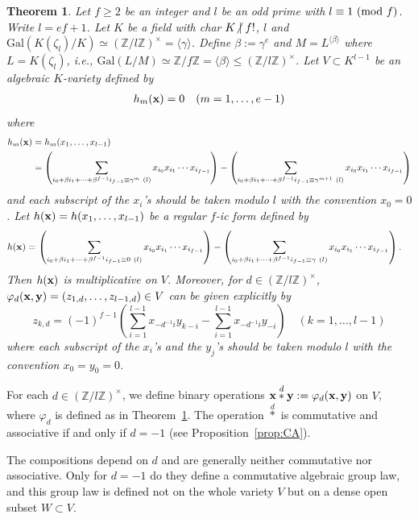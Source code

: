 \documentclass[a4paper, 11pt]{amsart}
\newcommand{\notmid}{\mathrel{\ooalign{$\mkern-5mu\not$\crcr$|$}}}
\newcommand{\Z}{\mathbb Z}
\newcommand{\Gal}{\mathrm{Gal}}
\theoremstyle{plain}
\newtheorem{thm}{Theorem}[section]
\theoremstyle{definition}
\numberwithin{equation}{section}
\begin{document}
\begin{thm}\label{mainth3}
Let $f\geq2$ be an integer and $l$ be an odd prime with $l \equiv 1\ ({\rm mod}\ f)$. 
Write $l=ef+1$.
Let $K$ be a field with char $K \notmid f!$, $l$ and 
$\Gal(K(\zeta_l)/K)\simeq (\Z/l\Z)^{\times}=\langle \gamma \rangle$. 
Define $\beta := \gamma^e$ and $M=L^{\langle \beta \rangle}$ where $L=K(\zeta_l)$, 
i.e., $\Gal(L/M)\simeq \Z/f\Z = \langle \beta \rangle \leq  (\Z/l\Z)^{\times}$.
Let $V \subset K^{l-1}$ be
an algebraic $K$-variety defined by
\begin{align*}
h_m({\bf x})=0\quad (m = 1,\ldots,e-1)
\end{align*}
where
\begin{align*}
h_m({\bf x})&=h_m(x_1,\ldots,x_{l-1})\\
&=\left(\sum_{i_0 + \beta i_1 + \cdots +\beta^{f-1}i_{f-1} \equiv \gamma^m \ (l)}x_{i_0}x_{i_1}\cdots x_{i_{f-1}}\right) - \left(\sum_{i_0 + \beta i_1 + \cdots +\beta^{f-1}i_{f-1} \equiv \gamma^{m+1} \ (l)}x_{i_0}x_{i_1}\cdots x_{i_{f-1}}\right)
\end{align*}
and each subscript of the $x_{i}$'s should be taken modulo $l$ with the convention $x_0=0$.
Let $h({\bf x})=h(x_1,\ldots,x_{l-1})$ be a regular $f$-ic form defined by
\begin{align*}
h({\bf x})
&=\left(\sum_{i_0 + \beta i_1 + \cdots +\beta^{f-1}i_{f-1}\equiv 0 \ (l)}x_{i_0}x_{i_1}\cdots x_{i_{f-1}}\right)
-\left(\sum_{i_0 + \beta i_1 + \cdots +\beta^{f-1}i_{f-1}\equiv \gamma \ (l)}x_{i_0}x_{i_1}\cdots x_{i_{f-1}}\right).
\end{align*}
Then $h({\bf x})$ is multiplicative on $V$.
Moreover, for $d \in (\Z/l\Z)^{\times}$, $\varphi_d ({\bf x},{\bf y})=(z_{1,d},\ldots,z_{l-1,d}) \in V$ 
can be given explicitly by
\[
z_{k,d}=(-1)^{f-1} \left(\sum_{i=1}^{l-1}x_{-d^{-1}i}y_{k-i} - \sum_{i=1}^{l-1}x_{-d^{-1}i}y_{-i}\right)\quad (k=1,\ldots,l-1)
\]
where each subscript of the $x_i$'s and the $y_j$'s should be taken modulo $l$ with the convention $x_0=y_0=0$.
\end{thm}

For each $d \in (\Z/l\Z)^\times$, we define binary operations ${\bf x}\overset{d}{\ast}{\bf y}:=\varphi_d({\bf x},{\bf y})$ on $V$, where $\varphi_d$ is defined as in Theorem~\ref{mainth3}.
The operation $\overset{d}{\ast}$ is commutative and associative if and only if $d=-1$ (see Proposition~\ref{prop:CA}).
 
The compositions depend on $d$ and are generally neither commutative nor associative. 
Only for $d=-1$ do they define a commutative algebraic group law, 
and this group law is defined not on the whole variety $V$ but on a dense open subset $W \subset V$.
\end{document}
